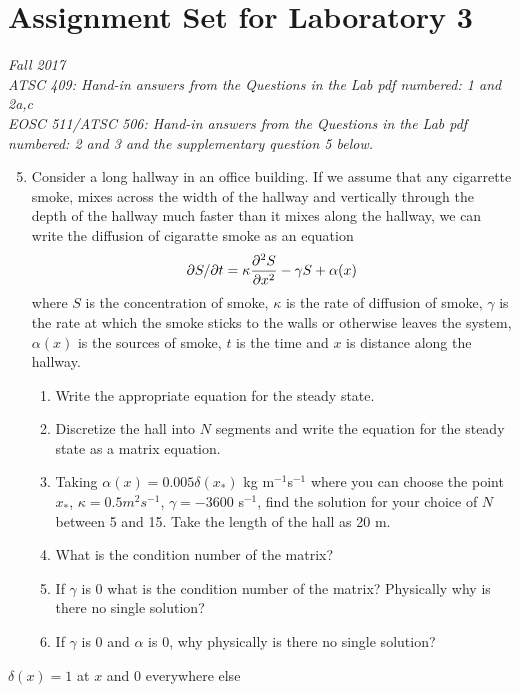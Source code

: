 \documentclass[12pt]{article}
\begin{document}
\section*{Assignment Set for Laboratory 3}
{\it Fall 2017\\
ATSC 409: Hand-in answers from the Questions in the Lab pdf numbered: 1 and 2a,c\\
EOSC 511/ATSC 506: Hand-in answers from the Questions in the Lab pdf numbered: 2 and 3 and the supplementary question 5 below.}


\begin{enumerate}
\setcounter{enumi}{4}
\item Consider a long hallway in an office building.  If we assume that any cigarrette smoke, mixes across the width of the hallway and vertically through the depth of the hallway much faster than it mixes along the hallway, we can write the diffusion of cigaratte smoke as an equation
\[
\partial S/\partial t = \kappa \frac {\partial^2 S}{\partial x^2} - \gamma S + \alpha(x)
\]
where $S$ is the concentration of smoke, $\kappa$ is the rate of diffusion of smoke, $\gamma$ is the rate at which the smoke sticks to the walls or otherwise leaves the system, $\alpha(x)$ is the sources of smoke, $t$ is the time and $x$ is distance along the hallway.
\begin{enumerate}
\item Write the appropriate equation for the steady state.
\item Discretize the hall into $N$ segments and write the equation for the steady state as a matrix equation.
\item Taking $\alpha(x) = 0.005 \delta(x_*)$ kg m$^{-1}$s$^{-1}$ where you can choose the point $x_*$, $\kappa = 0.5 m^2 s^{-1}$, $\gamma = -3600$ s$^{-1}$, find the solution for your choice of $N$ between 5 and 15.  Take the length of the hall as 20 m.
\item What is the condition number of the matrix?
\item If $\gamma$ is 0 what is the condition number of the matrix?  Physically why is there no single solution?
\item If $\gamma$ is 0 and $\alpha$ is 0, why physically is there no single solution?
\end{enumerate}
\end{enumerate}

$\delta(x) = 1$ at $x$ and $0$ everywhere else
\end{document}
